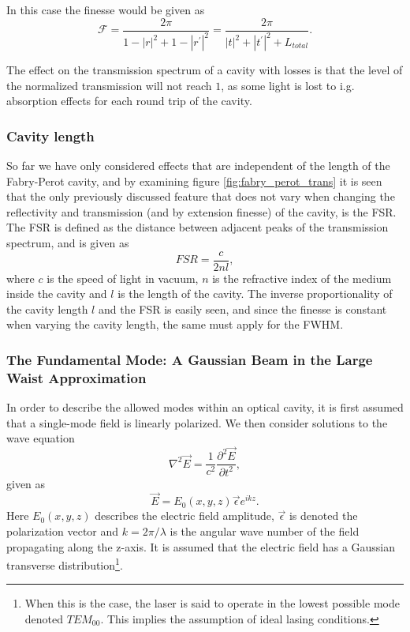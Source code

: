 In this case the finesse would be given as 
\begin{equation}
    \mathcal{F} = \frac{2 \pi}{1-|r|^2 + 1 - |r^{\prime}|^2} = \frac{2 \pi}{|t|^2 + |t^{\prime}|^2 + L_{total}}.
\end{equation}

The effect on the transmission spectrum of a cavity with losses is that the level of the normalized transmission will not reach $1$, as some light is lost to i.g. absorption effects for each round trip of the cavity.

\subsubsection{Cavity length}

So far we have only considered effects that are independent of the length of the Fabry-Perot cavity, and by examining figure \ref{fig:fabry_perot_trans} it is seen that the only previously discussed feature that does not vary when changing the reflectivity and transmission (and by extension finesse) of the cavity, is the FSR. The FSR is defined as the distance between adjacent peaks of the transmission spectrum, and is given as
\begin{equation}
    FSR = \frac{c}{2nl},
    \label{eq:FSR_formula}
\end{equation}
where $c$ is the speed of light in vacuum, $n$ is the refractive index of the medium inside the cavity and $l$ is the length of the cavity. The inverse proportionality of the cavity length $l$ and the FSR is easily seen, and since the finesse is constant when varying the cavity length, the same must apply for the FWHM. 


\subsubsection{The Fundamental Mode: A Gaussian Beam in the Large Waist Approximation}

In order to describe the allowed modes within an optical cavity, it is first assumed that a single-mode field is linearly polarized. We then consider solutions to the wave equation
\begin{equation}
    \nabla^2 \vec{E} = \frac{1}{c^2} \frac{\partial^2 \vec{E}}{\partial t^2},
\end{equation}
given as
\begin{equation}
    \vec{E} = E_0 (x,y,z) \vec{\epsilon} e^{i k z}. 
\end{equation}
Here $E_0(x,y,z)$ describes the electric field amplitude, $\vec{\epsilon}$ is denoted the polarization vector and $k=2 \pi / \lambda$ is the angular wave number of the field propagating along the z-axis. It is assumed that the electric field has a Gaussian transverse distribution\footnote{When this is the case, the laser is said to operate in the lowest possible mode denoted $TEM_{00}$. This implies the assumption of ideal lasing conditions.}.

